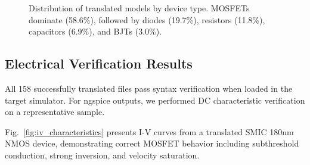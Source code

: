 \documentclass[conference]{IEEEtran}
\begin{document}
\begin{figure}[!t]
\centering
{}
\caption{Distribution of translated models by device type. MOSFETs dominate (58.6\%), followed by diodes (19.7\%), resistors (11.8\%), capacitors (6.9\%), and BJTs (3.0\%).}
\label{fig:device_dist}
\end{figure}

\subsection{Electrical Verification Results}

All 158 successfully translated files pass syntax verification when loaded in the target simulator. For ngspice outputs, we performed DC characteristic verification on a representative sample.

Fig.~\ref{fig:iv_characteristics} presents I-V curves from a translated SMIC 180nm NMOS device, demonstrating correct MOSFET behavior including subthreshold conduction, strong inversion, and velocity saturation.
\end{document}
